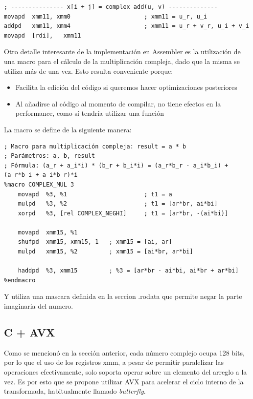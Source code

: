 \documentclass[a4paper]{article}
\begin{document}
\begin{verbatim}
; --------------- x[i + j] = complex_add(u, v) --------------
movapd  xmm11, xmm0                     ; xmm11 = u_r, u_i
addpd   xmm11, xmm4                     ; xmm11 = u_r + v_r, u_i + v_i
movapd  [rdi],   xmm11
\end{verbatim}

Otro detalle interesante de la implementación en Assembler es la utilización de una macro para el cálculo de la multiplicación compleja, dado que la misma se utiliza más de una vez. Esto resulta conveniente porque:

\begin{itemize}
    \item Facilita la edición del código si queremos hacer optimizaciones posteriores
    \item Al añadirse al código al momento de compilar, no tiene efectos en la performance, como sí tendría utilizar una función
\end{itemize}

La macro se define de la siguiente manera:

\begin{verbatim}
; Macro para multiplicación compleja: result = a * b
; Parámetros: a, b, result
; Fórmula: (a_r + a_i*i) * (b_r + b_i*i) = (a_r*b_r - a_i*b_i) + (a_r*b_i + a_i*b_r)*i
%macro COMPLEX_MUL 3
    movapd  %3, %1                      ; t1 = a
    mulpd   %3, %2                      ; t1 = [ar*br, ai*bi]
    xorpd   %3, [rel COMPLEX_NEGHI]     ; t1 = [ar*br, -(ai*bi)]

    movapd  xmm15, %1
    shufpd  xmm15, xmm15, 1   ; xmm15 = [ai, ar]
    mulpd   xmm15, %2         ; xmm15 = [ai*br, ar*bi]

    haddpd  %3, xmm15         ; %3 = [ar*br - ai*bi, ai*br + ar*bi]
%endmacro
\end{verbatim}

Y utiliza una mascara definida en la seccion .rodata que permite negar la parte imaginaria del numero.

\subsection{C + AVX}
Como se mencionó en la sección anterior, cada número complejo ocupa 128 bits, por lo que el uso de los registros xmm, a pesar de permitir paralelizar las operaciones efectivamente, solo soporta operar sobre un elemento del arreglo a la vez. Es por esto que se propone utilizar AVX para acelerar el ciclo interno de la transformada, habitualmente llamado \textit{butterfly}.
\end{document}
